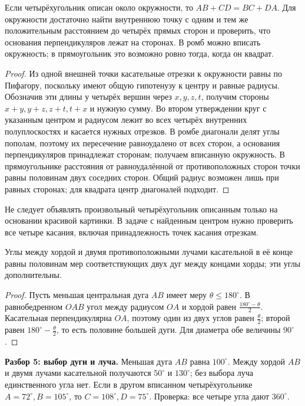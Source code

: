 \begin{theorem}
Если четырёхугольник описан около окружности, то \(AB+CD=BC+DA\). Для окружности достаточно найти внутреннюю точку с одним и тем же положительным расстоянием до четырёх прямых сторон и проверить, что основания перпендикуляров лежат на сторонах. В ромб можно вписать окружность; в прямоугольник это возможно ровно тогда, когда он квадрат.
\end{theorem}
\begin{proof}Из одной внешней точки касательные отрезки к окружности равны по Пифагору, поскольку имеют общую гипотенузу к центру и равные радиусы. Обозначив эти длины у четырёх вершин через \(x,y,z,t\), получим стороны \(x+y,y+z,z+t,t+x\) и нужную сумму. Во втором утверждении круг с указанным центром и радиусом лежит во всех четырёх внутренних полуплоскостях и касается нужных отрезков. В ромбе диагонали делят углы пополам, поэтому их пересечение равноудалено от всех сторон, а основания перпендикуляров принадлежат сторонам; получаем вписанную окружность. В прямоугольнике расстояния от равноудалённой от противоположных сторон точки равны половинам двух соседних сторон. Общий радиус возможен лишь при равных сторонах; для квадрата центр диагоналей подходит.\end{proof}
Не следует объявлять произвольный четырёхугольник описанным только на основании красивой картинки. В задаче с найденным центром нужно проверить все четыре касания, включая принадлежность точек касания отрезкам.
\begin{theorem}
Углы между хордой и двумя противоположными лучами касательной в её конце равны половинам мер соответствующих двух дуг между концами хорды; эти углы дополнительны.
\end{theorem}
\begin{proof}Пусть меньшая центральная дуга \(AB\) имеет меру \(\theta\le180^\circ\). В равнобедренном \(OAB\) угол между радиусом \(OA\) и хордой равен \(\frac{180^\circ-\theta}{2}\). Касательная перпендикулярна \(OA\), поэтому один из двух углов равен \(\frac{\theta}{2}\); второй равен \(180^\circ-\frac{\theta}{2}\), то есть половине большей дуги. Для диаметра обе величины \(90^\circ\).\end{proof}
\begin{example}\textbf{Разбор 5: выбор дуги и луча.} Меньшая дуга \(AB\) равна \(100^\circ\). Между хордой \(AB\) и двумя лучами касательной получаются \(50^\circ\) и \(130^\circ\); без выбора луча единственного угла нет. Если в другом вписанном четырёхугольнике \(A=72^\circ,B=105^\circ\), то \(C=108^\circ,D=75^\circ\). Проверка: все четыре угла дают \(360^\circ\).\end{example}

